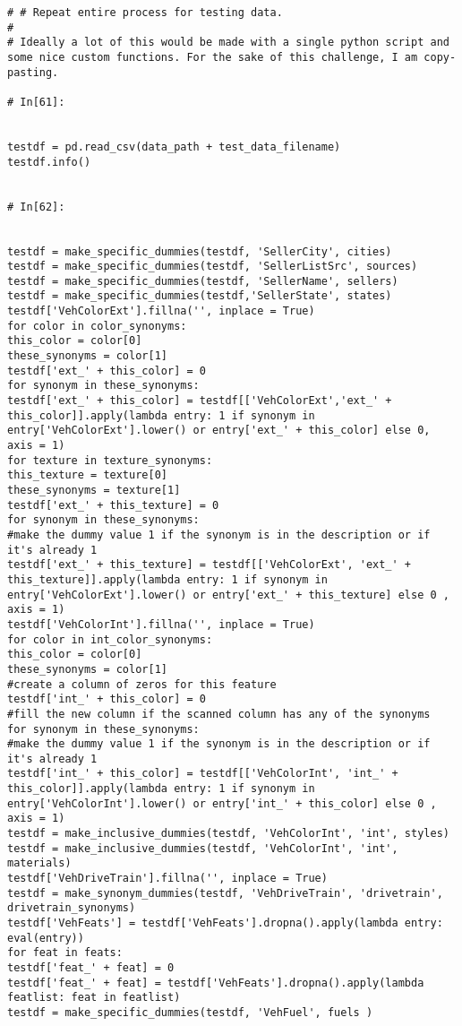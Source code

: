 \begin{verbatim}
# # Repeat entire process for testing data.
# 
# Ideally a lot of this would be made with a single python script and some nice custom functions. For the sake of this challenge, I am copy-pasting.

# In[61]:


testdf = pd.read_csv(data_path + test_data_filename)
testdf.info()


# In[62]:


testdf = make_specific_dummies(testdf, 'SellerCity', cities)
testdf = make_specific_dummies(testdf, 'SellerListSrc', sources)
testdf = make_specific_dummies(testdf, 'SellerName', sellers)
testdf = make_specific_dummies(testdf,'SellerState', states)
testdf['VehColorExt'].fillna('', inplace = True)
for color in color_synonyms:
this_color = color[0]
these_synonyms = color[1]
testdf['ext_' + this_color] = 0
for synonym in these_synonyms:
testdf['ext_' + this_color] = testdf[['VehColorExt','ext_' + this_color]].apply(lambda entry: 1 if synonym in entry['VehColorExt'].lower() or entry['ext_' + this_color] else 0, axis = 1)
for texture in texture_synonyms:
this_texture = texture[0]
these_synonyms = texture[1]
testdf['ext_' + this_texture] = 0
for synonym in these_synonyms:
#make the dummy value 1 if the synonym is in the description or if it's already 1
testdf['ext_' + this_texture] = testdf[['VehColorExt', 'ext_' + this_texture]].apply(lambda entry: 1 if synonym in entry['VehColorExt'].lower() or entry['ext_' + this_texture] else 0 , axis = 1)
testdf['VehColorInt'].fillna('', inplace = True)
for color in int_color_synonyms:
this_color = color[0]
these_synonyms = color[1]
#create a column of zeros for this feature
testdf['int_' + this_color] = 0
#fill the new column if the scanned column has any of the synonyms
for synonym in these_synonyms:
#make the dummy value 1 if the synonym is in the description or if it's already 1
testdf['int_' + this_color] = testdf[['VehColorInt', 'int_' + this_color]].apply(lambda entry: 1 if synonym in entry['VehColorInt'].lower() or entry['int_' + this_color] else 0 , axis = 1)
testdf = make_inclusive_dummies(testdf, 'VehColorInt', 'int', styles)
testdf = make_inclusive_dummies(testdf, 'VehColorInt', 'int', materials)
testdf['VehDriveTrain'].fillna('', inplace = True)
testdf = make_synonym_dummies(testdf, 'VehDriveTrain', 'drivetrain', drivetrain_synonyms)
testdf['VehFeats'] = testdf['VehFeats'].dropna().apply(lambda entry: eval(entry))
for feat in feats:
testdf['feat_' + feat] = 0
testdf['feat_' + feat] = testdf['VehFeats'].dropna().apply(lambda featlist: feat in featlist)
testdf = make_specific_dummies(testdf, 'VehFuel', fuels )


\end{verbatim}
